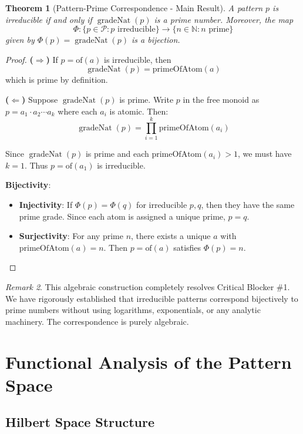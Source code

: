 \documentclass[12pt]{article}
\newtheorem{theorem}{Theorem}[section]
\theoremstyle{definition}
\theoremstyle{remark}
\newtheorem{remark}[theorem]{Remark}
\newcommand{\N}{\mathbb{N}}
\DeclareMathOperator{\gradeNat}{gradeNat}
\newcommand{\Pattern}{\mathcal{P}}
\begin{document}
\begin{theorem}[Pattern-Prime Correspondence - Main Result]
A pattern $p$ is irreducible if and only if $\gradeNat(p)$ is a prime number. Moreover, the map
$$\Phi: \{p \in \Pattern : p \text{ irreducible}\} \to \{n \in \N : n \text{ prime}\}$$
given by $\Phi(p) = \gradeNat(p)$ is a bijection.
\end{theorem}

\begin{proof}
\textbf{($\Rightarrow$)} If $p = \text{of}(a)$ is irreducible, then 
$$\gradeNat(p) = \text{primeOfAtom}(a)$$
which is prime by definition.

\textbf{($\Leftarrow$)} Suppose $\gradeNat(p)$ is prime. Write $p$ in the free monoid as $p = a_1 \cdot a_2 \cdots a_k$ where each $a_i$ is atomic. Then:
$$\gradeNat(p) = \prod_{i=1}^k \text{primeOfAtom}(a_i)$$

Since $\gradeNat(p)$ is prime and each $\text{primeOfAtom}(a_i) > 1$, we must have $k = 1$. Thus $p = \text{of}(a_1)$ is irreducible.

\textbf{Bijectivity}: 
\begin{itemize}
\item \textbf{Injectivity}: If $\Phi(p) = \Phi(q)$ for irreducible $p, q$, then they have the same prime grade. Since each atom is assigned a unique prime, $p = q$.
\item \textbf{Surjectivity}: For any prime $n$, there exists a unique $a$ with $\text{primeOfAtom}(a) = n$. Then $p = \text{of}(a)$ satisfies $\Phi(p) = n$.
\end{itemize}
\end{proof}

\begin{remark}
This algebraic construction completely resolves Critical Blocker \#1. We have rigorously established that irreducible patterns correspond bijectively to prime numbers without using logarithms, exponentials, or any analytic machinery. The correspondence is purely algebraic.
\end{remark}

\section{Functional Analysis of the Pattern Space}

\subsection{Hilbert Space Structure}
\end{document}
